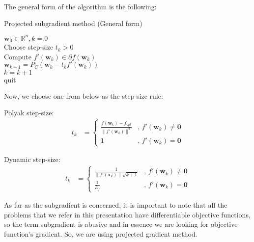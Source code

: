 \documentclass{beamer}
\begin{document}
\begin{frame}

\justifying
The general form of the algorithm is the following:\\

\vspace{0.4cm}
\justifying
	\begin{algorithm}[H]
			\caption{Projected subgradient method (General form)}\label{alg:1}
			$\mathbf{w}_0 \in \mathbb{R}^{n}, k = 0$\\
			{
				Choose step-size $t_{k} > 0$\\
				Compute $f'(\mathbf{w}_{k}) \in \partial{f(\mathbf{w}_{k})}$\\
				$\mathbf{w}_{k+1} = P_{C}(\mathbf{w}_{k} - t_{k} f'(\mathbf{w}_{k}))$\\
				$k = k + 1$\\
				{
					quit
				}
			}
		\end{algorithm}

\end{frame}




\begin{frame}

\justifying
Now, we choose one from below as the step-size rule:  

\vspace{0.2cm}
\justifying
Polyak step-size:
\begin{equation*}
\begin{aligned}
t_{k} & =
	\begin{cases}
		\frac{f(\mathbf{w}_{k})-f_{opt}}{\|f'(\mathbf{w}_{k})\|^{2}} & \text{, } f'(\mathbf{w}_{k}) \neq \mathbf{0} \\
		1 & \text{, } f'(\mathbf{w}_{k}) = \mathbf{0}
	\end{cases}
\end{aligned}
\end{equation*}

\vspace{0.2cm}
\justifying
Dynamic step-size:
\begin{equation*}
\begin{aligned}
t_{k} & =
	\begin{cases}
		\frac{1}{\|f'(\mathbf{x}_{k})\| \sqrt{k+1}} & \text{, } f'(\mathbf{w}_{k}) \neq \mathbf{0} \\
		\frac{1}{L_f} & \text{, } f'(\mathbf{w}_{k}) = \mathbf{0}
	\end{cases}
\end{aligned}
\end{equation*}

\vspace{0.2cm}
\justifying
As far as the subgradient is concerned, it is important to note that all the problems that we refer in this presentation have differentiable objective functions, so the term subgradient is abusive and in essence we are looking for objective function's gradient. So, we are using projected gradient method.


\end{frame}
\end{document}
